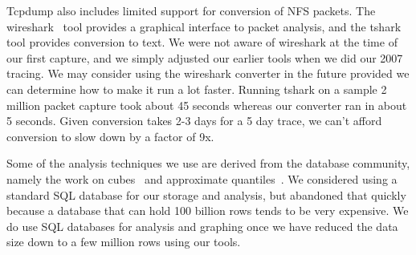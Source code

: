 
Tcpdump also includes limited support for conversion of NFS packets.
The wireshark~\cite{wireshark} tool provides a graphical interface to
packet analysis, and the tshark tool provides conversion to text.  We
were not aware of wireshark at the time of our first capture, and we
simply adjusted our earlier tools when we did our 2007 tracing.  We
may consider using the wireshark converter in the future provided we
can determine how to make it run a lot faster.  Running tshark on a
sample 2 million packet capture took about 45 seconds whereas our
converter ran in about 5 seconds.  Given conversion takes 2-3 days for
a 5 day trace, we can't afford conversion to slow down by a factor of
9x.

Some of the analysis techniques we use are derived from the database
community, namely the work on cubes~\cite{gray97cube} and approximate
quantiles~\cite{Manku98approximatemedians}.  We considered using a
standard SQL database for our storage and analysis, but abandoned that
quickly because a database that can hold 100 billion rows tends to be
very expensive.  We do use SQL databases for analysis and graphing
once we have reduced the data size down to a few million rows using
our tools.




